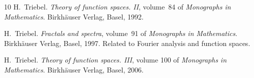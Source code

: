 \documentclass[a4paper,10pt]{article}
\newcommand{\tmtextit}[1]{{\itshape{#1}}}
\begin{document}
\begin{thebibliography}{10}
  H.~Triebel. {\newblock}\tmtextit{Theory of function
  spaces. II},  volume~84  of \tmtextit{Monographs in Mathematics}.
  {\newblock}Birkh{\"a}user Verlag, Basel, 1992.{\newblock}
  
  H.~Triebel. {\newblock}\tmtextit{Fractals and
  spectra},  volume~91  of \tmtextit{Monographs in Mathematics}.
  {\newblock}Birkh{\"a}user Verlag, Basel, 1997. {\newblock}Related to Fourier
  analysis and function spaces.{\newblock}
  
  H.~Triebel. {\newblock}\tmtextit{Theory of function
  spaces. III},  volume  100  of \tmtextit{Monographs in Mathematics}.
  {\newblock}Birkh{\"a}user Verlag, Basel, 2006.{\newblock}
\end{thebibliography}
\end{document}
